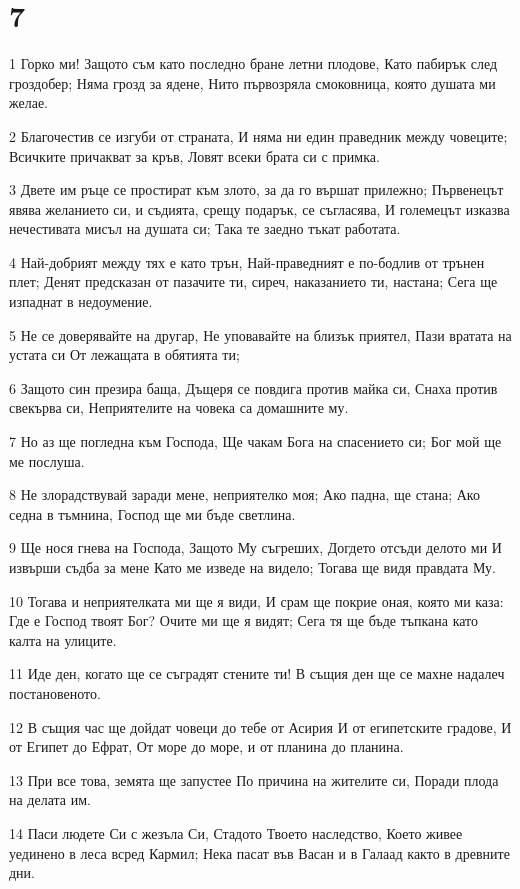 \chapter{7}

\par 1 Горко ми! Защото съм като последно бране летни плодове, Като пабирък след гроздобер; Няма грозд за ядене, Нито първозряла смоковница, която душата ми желае.
\par 2 Благочестив се изгуби от страната, И няма ни един праведник между човеците; Всичките причакват за кръв, Ловят всеки брата си с примка.
\par 3 Двете им ръце се простират към злото, за да го вършат прилежно; Първенецът явява желанието си, и съдията, срещу подарък, се съгласява, И големецът изказва нечестивата мисъл на душата си; Така те заедно тъкат работата.
\par 4 Най-добрият между тях е като трън, Най-праведният е по-бодлив от трънен плет; Денят предсказан от пазачите ти, сиреч, наказанието ти, настана; Сега ще изпаднат в недоумение.
\par 5 Не се доверявайте на другар, Не уповавайте на близък приятел, Пази вратата на устата си От лежащата в обятията ти;
\par 6 Защото син презира баща, Дъщеря се повдига против майка си, Снаха против свекърва си, Неприятелите на човека са домашните му.
\par 7 Но аз ще погледна към Господа, Ще чакам Бога на спасението си; Бог мой ще ме послуша.
\par 8 Не злорадствувай заради мене, неприятелко моя; Ако падна, ще стана; Ако седна в тъмнина, Господ ще ми бъде светлина.
\par 9 Ще нося гнева на Господа, Защото Му съгреших, Догдето отсъди делото ми И извърши съдба за мене Като ме изведе на видело; Тогава ще видя правдата Му.
\par 10 Тогава и неприятелката ми ще я види, И срам ще покрие оная, която ми каза: Где е Господ твоят Бог? Очите ми ще я видят; Сега тя ще бъде тъпкана като калта на улиците.
\par 11 Иде ден, когато ще се съградят стените ти! В същия ден ще се махне надалеч постановеното.
\par 12 В същия час ще дойдат човеци до тебе от Асирия И от египетските градове, И от Египет до Ефрат, От море до море, и от планина до планина.
\par 13 При все това, земята ще запустее По причина на жителите си, Поради плода на делата им.
\par 14 Паси людете Си с жезъла Си, Стадото Твоето наследство, Което живее уединено в леса всред Кармил; Нека пасат във Васан и в Галаад както в древните дни.
